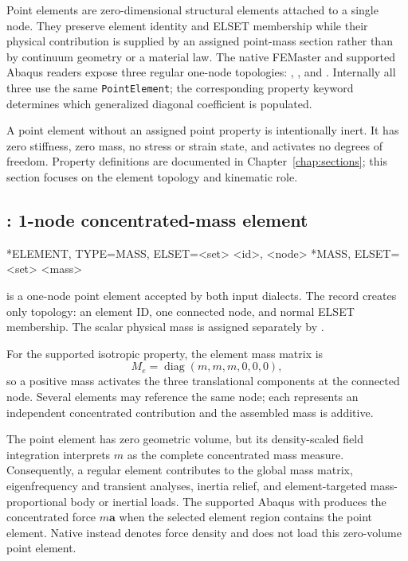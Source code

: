 Point elements are zero-dimensional structural elements attached to a single node. They preserve element identity and ELSET membership while their physical contribution is supplied by an assigned point-mass section rather than by continuum geometry or a material law. The native FEMaster and supported Abaqus readers expose three regular one-node topologies: , , and . Internally all three use the same \texttt{PointElement}; the corresponding property keyword determines which generalized diagonal coefficient is populated.

A point element without an assigned point property is intentionally inert. It has zero stiffness, zero mass, no stress or strain state, and activates no degrees of freedom. Property definitions are documented in Chapter~\ref{chap:sections}; this section focuses on the element topology and kinematic role.

\clearpage
\subsection{: 1-node concentrated-mass element}

\begin{syntax}
*ELEMENT, TYPE=MASS, ELSET=<set>
<id>, <node>
*MASS, ELSET=<set>
<mass>
\end{syntax}

 is a one-node point element accepted by both input dialects. The  record creates only topology: an element ID, one connected node, and normal ELSET membership. The scalar physical mass is assigned separately by .

For the supported isotropic property, the element mass matrix is
\[
M_e=\operatorname{diag}(m,m,m,0,0,0),
\]
so a positive mass activates the three translational components at the connected node. Several  elements may reference the same node; each represents an independent concentrated contribution and the assembled mass is additive.

The point element has zero geometric volume, but its density-scaled field integration interprets \(m\) as the complete concentrated mass measure. Consequently, a regular  element contributes to the global mass matrix, eigenfrequency and transient analyses, inertia relief, and element-targeted mass-proportional body or inertial loads. The supported Abaqus  with  produces the concentrated force \(m\boldsymbol a\) when the selected element region contains the point element. Native  instead denotes force density and does not load this zero-volume point element.

